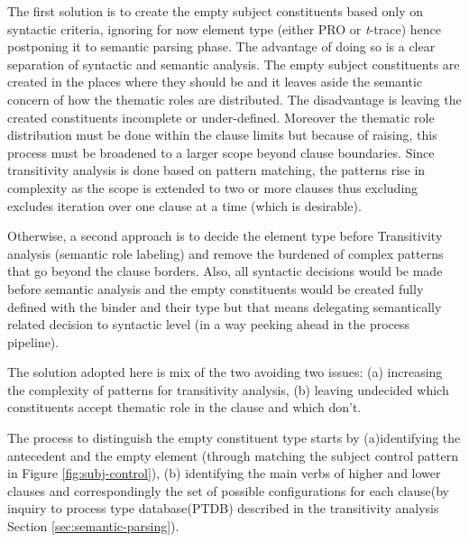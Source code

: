 The first solution is to create the empty subject constituents based only on syntactic criteria, ignoring for now element type (either PRO or \textit{t}-trace) hence postponing it to semantic parsing phase. The advantage of doing so is a clear separation of syntactic and semantic analysis. The empty subject constituents are created in the places where they should be and it leaves aside the semantic concern of how the thematic roles are distributed. The disadvantage is leaving the created constituents incomplete or under-defined. Moreover the thematic role distribution must be done within the clause limits but because of raising, this process must be broadened to a larger scope beyond clause boundaries. Since transitivity analysis is done based on pattern matching, the patterns rise in complexity as the scope is extended to two or more clauses thus excluding excludes iteration over one clause at a time (which is desirable). 

Otherwise, a second approach is to decide the element type before Transitivity analysis (semantic role labeling) and remove the burdened of complex patterns that go beyond the clause borders. Also, all syntactic decisions would be made before semantic analysis and the empty constituents would be created fully defined with the binder and their type but that means delegating semantically related decision to syntactic level (in a way peeking ahead in the process pipeline).

The solution adopted here is mix of the two avoiding two issues: (a) increasing the complexity of patterns for transitivity analysis, (b) leaving undecided which constituents accept thematic role in the clause and which don't. 

The process to distinguish the empty constituent type starts by (a)identifying the antecedent and the empty element (through matching the subject control pattern in Figure \ref{fig:subj-control}), (b) identifying the main verbs of higher and lower clauses and correspondingly the set of possible configurations for each clause(by inquiry to process type database(PTDB) described in the transitivity analysis Section \ref{sec:semantic-parsing}).

